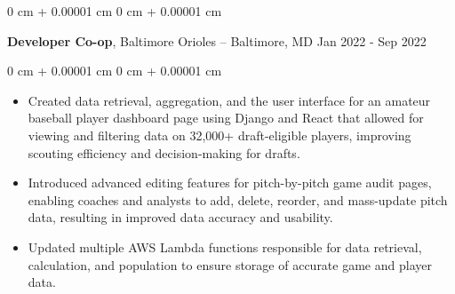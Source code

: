 \documentclass[10pt, letterpaper]{article}
\newenvironment{highlights}{
    \begin{itemize}[
        topsep=0.10 cm,
        parsep=0.10 cm,
        partopsep=0pt,
        itemsep=0pt,
        leftmargin=0 cm + 10pt
    ]
}{
    \end{itemize}
} %
\newenvironment{onecolentry}{
    \begin{adjustwidth}{
        0 cm + 0.00001 cm
    }{
        0 cm + 0.00001 cm
    }
}{
    \end{adjustwidth}
} %
\newenvironment{twocolentry}[2][]{
    \onecolentry
    \def\secondColumn{#2}
    \setcolumnwidth{\fill, 4.5 cm}
    \begin{paracol}{2}
}{
    \switchcolumn \raggedleft \secondColumn
    \end{paracol}
    \endonecolentry
} %
\begin{document}
    \begin{twocolentry}{
        Jan 2022 - Sep 2022
    }
    \textbf{Developer Co-op}, Baltimore Orioles -- Baltimore, MD \end{twocolentry}
    \vspace{0.10 cm}
    \begin{onecolentry}
      \begin{highlights}
        \item Created data retrieval, aggregation, and the user interface for an amateur baseball player dashboard page using Django and React that allowed for viewing and filtering data on 32,000+ draft-eligible players, improving scouting efficiency and decision-making for drafts.
        \item Introduced advanced editing features for pitch-by-pitch game audit pages, enabling coaches and analysts to add, delete, reorder, and mass-update pitch data, resulting in improved data accuracy and usability.
        \item Updated multiple AWS Lambda functions responsible for data retrieval, calculation, and population to ensure storage of accurate game and player data.
      \end{highlights}
    \end{onecolentry}
    
\end{document}
